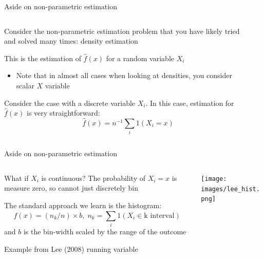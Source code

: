 \documentclass[notes,11pt, aspectratio=169]{beamer}
\newenvironment{wideitemize}{\itemize\addtolength{\itemsep}{10pt}}{\enditemize}
\begin{document}
\begin{frame}{Aside on non-parametric estimation}
  \begin{columns}[onlytextwidth, T] %
    \begin{column}{.8\textwidth}
      \begin{wideitemize}
      \item Consider the non-parametric estimation problem that you have
        likely tried and solved many times: density estimation
      \item This is the estimation of $\hat{f}(x)$ for a random variable $X_{i}$
        \begin{itemize}
        \item Note that in almost all cases when looking at densities, you
        consider scalar $X$ variable
        \end{itemize}
      \item Consider the case with a discrete variable $X_{i}$. In this case, estimation for $\hat{f}(x)$ is very straightforward:
        \begin{equation*}
          \hat{f}(x) = n^{-1}\sum_{i} 1(X_{i} = x)
        \end{equation*}
      \end{wideitemize}
    \end{column}%
    \hfill%
    \begin{column}{.4\textwidth}
    \end{column}%
  \end{columns}
\end{frame}

\begin{frame}{Aside on non-parametric estimation}
  \begin{columns}[onlytextwidth, T] %
    \begin{column}{.6\textwidth}
      \begin{wideitemize}
      \item What if $X_{i}$ is continuous? The probability of $X_{i} =
        x$ is measure zero, so cannot just discretely bin
      \item The standard approach we learn is the histogram:
        \begin{equation*}
          \hat{f}(x) = (n_{k}/n) \times b, \; n_{k} = \sum_{i} 1(X_{i} \in \text{k interval}) 
        \end{equation*}
        and $b$ is the bin-width scaled by the range of the outcome
      \item Example from Lee (2008) running variable
      \end{wideitemize}
    \end{column}%
    \hfill%
    \begin{column}{.4\textwidth}
      \texttt{[image: images/lee\_hist.png]}
    \end{column}%
  \end{columns}
\end{frame}
\end{document}
